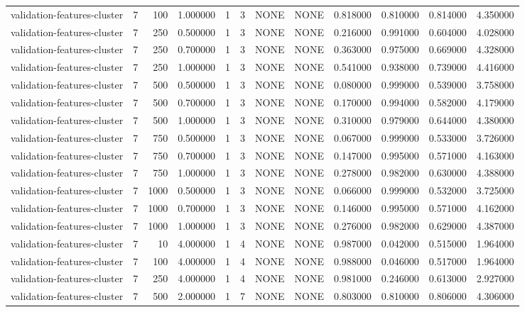 \begin{tabular}{lrrrllllrrrr}
validation-features-cluster & 7 & 100 & 1.000000 & 1 & 3 & NONE & NONE & 0.818000 & 0.810000 & 0.814000 & 4.350000 \\
validation-features-cluster & 7 & 250 & 0.500000 & 1 & 3 & NONE & NONE & 0.216000 & 0.991000 & 0.604000 & 4.028000 \\
validation-features-cluster & 7 & 250 & 0.700000 & 1 & 3 & NONE & NONE & 0.363000 & 0.975000 & 0.669000 & 4.328000 \\
validation-features-cluster & 7 & 250 & 1.000000 & 1 & 3 & NONE & NONE & 0.541000 & 0.938000 & 0.739000 & 4.416000 \\
validation-features-cluster & 7 & 500 & 0.500000 & 1 & 3 & NONE & NONE & 0.080000 & 0.999000 & 0.539000 & 3.758000 \\
validation-features-cluster & 7 & 500 & 0.700000 & 1 & 3 & NONE & NONE & 0.170000 & 0.994000 & 0.582000 & 4.179000 \\
validation-features-cluster & 7 & 500 & 1.000000 & 1 & 3 & NONE & NONE & 0.310000 & 0.979000 & 0.644000 & 4.380000 \\
validation-features-cluster & 7 & 750 & 0.500000 & 1 & 3 & NONE & NONE & 0.067000 & 0.999000 & 0.533000 & 3.726000 \\
validation-features-cluster & 7 & 750 & 0.700000 & 1 & 3 & NONE & NONE & 0.147000 & 0.995000 & 0.571000 & 4.163000 \\
validation-features-cluster & 7 & 750 & 1.000000 & 1 & 3 & NONE & NONE & 0.278000 & 0.982000 & 0.630000 & 4.388000 \\
validation-features-cluster & 7 & 1000 & 0.500000 & 1 & 3 & NONE & NONE & 0.066000 & 0.999000 & 0.532000 & 3.725000 \\
validation-features-cluster & 7 & 1000 & 0.700000 & 1 & 3 & NONE & NONE & 0.146000 & 0.995000 & 0.571000 & 4.162000 \\
validation-features-cluster & 7 & 1000 & 1.000000 & 1 & 3 & NONE & NONE & 0.276000 & 0.982000 & 0.629000 & 4.387000 \\
validation-features-cluster & 7 & 10 & 4.000000 & 1 & 4 & NONE & NONE & 0.987000 & 0.042000 & 0.515000 & 1.964000 \\
validation-features-cluster & 7 & 100 & 4.000000 & 1 & 4 & NONE & NONE & 0.988000 & 0.046000 & 0.517000 & 1.964000 \\
validation-features-cluster & 7 & 250 & 4.000000 & 1 & 4 & NONE & NONE & 0.981000 & 0.246000 & 0.613000 & 2.927000 \\
validation-features-cluster & 7 & 500 & 2.000000 & 1 & 7 & NONE & NONE & 0.803000 & 0.810000 & 0.806000 & 4.306000 \\

\end{tabular}
